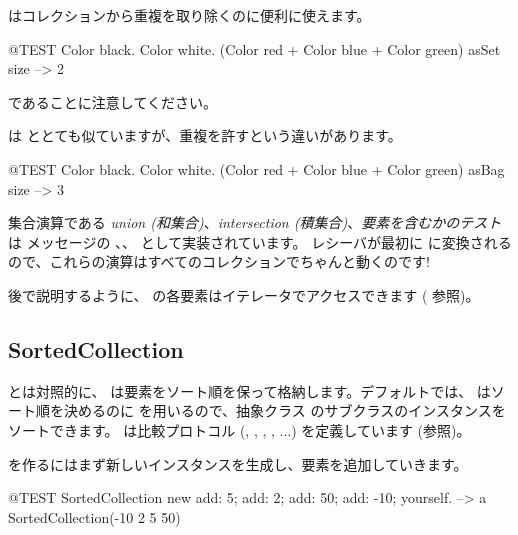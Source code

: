\documentclass[a4paper,10pt,twoside]{book}
\begin{document}
 はコレクションから重複を取り除くのに便利に使えます。
\begin{code}{@TEST}
{ Color black. Color white. (Color red + Color blue + Color green) } asSet size --> 2
\end{code}
\noindent
{} であることに注意してください。

 は  ととても似ていますが、重複を許すという違いがあります。
\begin{code}{@TEST}
{ Color black. Color white. (Color red + Color blue + Color green) } asBag size --> 3
\end{code}

集合演算である \emph{union (和集合)}、\emph{intersection (積集合)}、\emph{要素を含むかのテスト} は  メッセージの 、、 として実装されています。
レシーバが最初に  に変換されるので、これらの演算はすべてのコレクションでちゃんと動くのです!


後で説明するように、 の各要素はイテレータでアクセスできます ( 参照)。

\subsection{SortedCollection}
 とは対照的に、 は要素をソート順を保って格納します。デフォルトでは、 はソート順を決めるのに  を用いるので、抽象クラス  のサブクラスのインスタンスをソートできます。 は比較プロトコル (, , , , ...) を定義しています
(参照)。

 を作るにはまず新しいインスタンスを生成し、要素を追加していきます。
\begin{code}{@TEST}
SortedCollection new add: 5; add: 2; add: 50; add: -10; yourself. --> a SortedCollection(-10 2 5 50)
\end{code}
\end{document}
